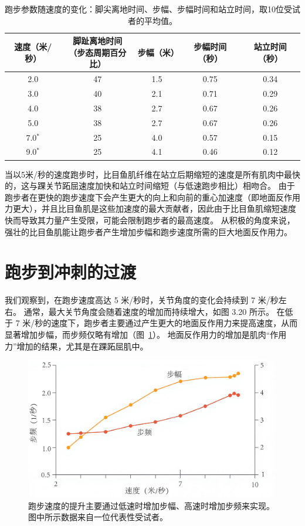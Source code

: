 \begin{table}[htbp]
	\caption{跑步参数随速度的变化：脚尖离地时间、步幅、步幅时间和站立时间，取10位受试者的平均值。} \label{tab:12_1} \centering
	\begin{tabular}{ccccc} %
		\toprule
		速度（米/秒）& \makecell{脚趾离地时间\\（步态周期百分比）} & 步幅（米） & 步幅时间（秒） & 站立时间（秒）\\
		\midrule
		2.0 & 47 & 1.5 & 0.75 & 0.34 \\
		3.0 & 40 & 2.1 & 0.71 & 0.29 \\
		4.0 & 38 & 2.7 & 0.67 & 0.26 \\
		5.0 & 38 & 2.7 & 0.67 & 0.26 \\
		7.0$^*$ & 25 & 4.0 & 0.57 & 0.15 \\
		9.0$^*$ & 25 & 4.1 & 0.46 & 0.12 \\
		\bottomrule
	\end{tabular}
\end{table}


当以5米/秒的速度跑步时，比目鱼肌纤维在站立后期缩短的速度是所有肌肉中最快的，这与踝关节跖屈速度加快和站立时间缩短（与低速跑步相比）相吻合。
由于跑步者在更快的跑步速度下会产生更大的向上和向前的重心加速度（即地面反作用力更大），并且比目鱼肌是这些加速度的最大贡献者，因此由于比目鱼肌缩短速度快而导致其力量产生受限，可能会限制跑步者的最高速度。
从积极的角度来说，强壮的比目鱼肌能让跑步者产生增加步幅和跑步速度所需的巨大地面反作用力。


\section{跑步到冲刺的过渡}

我们观察到，在跑步速度高达 5 米/秒时，关节角度的变化会持续到 7 米/秒左右。
通常，最大关节角度会随着速度的增加而持续增大，如图 3.20 所示。
在低于 7 米/秒的速度下，跑步者主要通过产生更大的地面反作用力来提高速度，从而显著增加步幅，而步频仅略有增加（图~\ref{fig:12_5}）。
地面反作用力的增加是肌肉“作用力”增加的结果，尤其是在踝跖屈肌中。


\begin{figure}[!htb]
	\centering
	\includegraphics[width=0.75\linewidth]{chap12/12_5}
	\caption{跑步速度的提升主要通过低速时增加步幅、高速时增加步频来实现。
		图中所示数据来自一位代表性受试者\cite{weyand2000faster}。 \label{fig:12_5}}
\end{figure}


